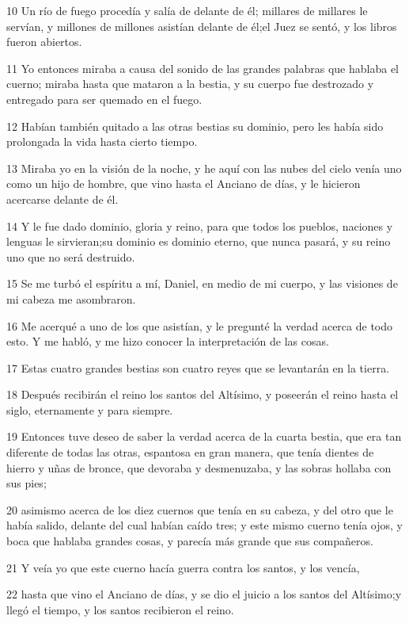 \par 10 Un río de fuego procedía y salía de delante de él; millares de millares le servían, y millones de millones asistían delante de él;el Juez se sentó, y los libros fueron abiertos. 
\par 11 Yo entonces miraba a causa del sonido de las grandes palabras que hablaba el cuerno; miraba hasta que mataron a la bestia, y su cuerpo fue destrozado y entregado para ser quemado en el fuego.
\par 12 Habían también quitado a las otras bestias su dominio, pero les había sido prolongada la vida hasta cierto tiempo.
\par 13 Miraba yo en la visión de la noche, y he aquí con las nubes del cielo venía uno como un hijo de hombre, que vino hasta el Anciano de días, y le hicieron acercarse delante de él.
\par 14 Y le fue dado dominio, gloria y reino, para que todos los pueblos, naciones y lenguas le sirvieran;su dominio es dominio eterno, que nunca pasará, y su reino uno que no será destruido.
\par 15 Se me turbó el espíritu a mí, Daniel, en medio de mi cuerpo, y las visiones de mi cabeza me asombraron.
\par 16 Me acerqué a uno de los que asistían, y le pregunté la verdad acerca de todo esto. Y me habló, y me hizo conocer la interpretación de las cosas.
\par 17 Estas cuatro grandes bestias son cuatro reyes que se levantarán en la tierra.
\par 18 Después recibirán el reino los santos del Altísimo, y poseerán el reino hasta el siglo, eternamente y para siempre. 
\par 19 Entonces tuve deseo de saber la verdad acerca de la cuarta bestia, que era tan diferente de todas las otras, espantosa en gran manera, que tenía dientes de hierro y uñas de bronce, que devoraba y desmenuzaba, y las sobras hollaba con sus pies;
\par 20 asimismo acerca de los diez cuernos que tenía en su cabeza, y del otro que le había salido, delante del cual habían caído tres; y este mismo cuerno tenía ojos, y boca que hablaba grandes cosas, y parecía más grande que sus compañeros.
\par 21 Y veía yo que este cuerno hacía guerra contra los santos, y los vencía, 
\par 22 hasta que vino el Anciano de días, y se dio el juicio a los santos del Altísimo;y llegó el tiempo, y los santos recibieron el reino.
